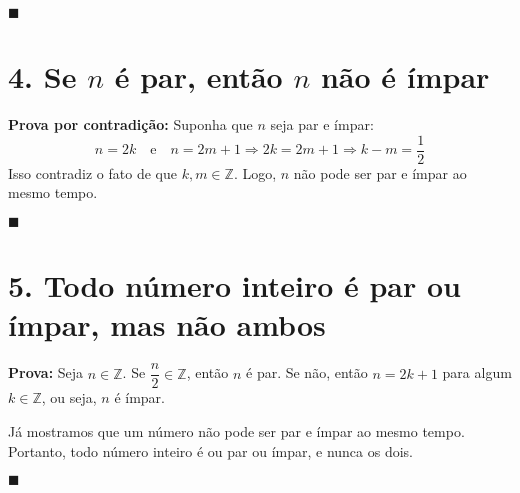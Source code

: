 \documentclass[12pt]{article}
\begin{document}
\hfill\(\blacksquare\)

\section*{4. Se \( n \) é par, então \( n \) não é ímpar}

\textbf{Prova por contradição:}  
Suponha que \( n \) seja par e ímpar:  
\[
n = 2k \quad \text{e} \quad n = 2m + 1
\Rightarrow 2k = 2m + 1 \Rightarrow k - m = \frac{1}{2}
\]
Isso contradiz o fato de que \( k, m \in \mathbb{Z} \).  
Logo, \( n \) não pode ser par e ímpar ao mesmo tempo.

\hfill\(\blacksquare\)

\section*{5. Todo número inteiro é par ou ímpar, mas não ambos}

\textbf{Prova:}  
Seja \( n \in \mathbb{Z} \).  
Se \( \dfrac{n}{2} \in \mathbb{Z} \), então \( n \) é par.  
Se não, então \( n = 2k + 1 \) para algum \( k \in \mathbb{Z} \), ou seja, \( n \) é ímpar.

Já mostramos que um número não pode ser par e ímpar ao mesmo tempo.  
Portanto, todo número inteiro é ou par ou ímpar, e nunca os dois.

\hfill\(\blacksquare\)
\end{document}
